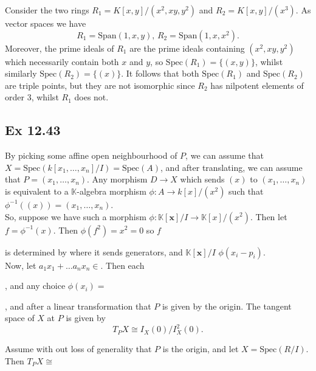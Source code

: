 \documentclass{article}
\theoremstyle{definition}
\newcommand{\K}{\mathbb{K}}
\newcommand{\Kx}{\K[\bm{x}]}
\newcommand{\Spec}{\text{Spec}}
\begin{document}
Consider the two rings $R_1 = K[x, y]/(x^2, xy, y^2)$ and $R_2 = K[x,
y]/(x^3)$. As vector spaces we have 
\[
	R_1 = \text{Span}(1, x, y), \,
	R_2 = \text{Span}(1, x, x^2).
\] 
Moreover, the prime ideals of $R_1$ are the prime ideals containing $(x^2, xy,
y^2)$ which necessarily contain both $x$ and $y$, so $\Spec(R_1) = \{(x, y)\}$,
whilst similarly $\Spec(R_2) = \{(x)\}$. It follows that both $\Spec(R_1)$ and
$\Spec(R_2)$ are triple points, but they are not isomorphic since $R_2$ has
nilpotent elements of order $3$, whilst $R_1$ does not. 

\subsection*{Ex 12.43}

By picking some affine open neighbourhood of $P$, we can assume that $X =
\Spec(k[x_1, \ldots, x_n]/I) = \Spec(A)$, and after translating, we can assume
that $P = (x_1, \ldots, x_n)$. Any morphism $D \to X$ which sends $(x)$ to
$(x_1, \ldots, x_n)$ is equivalent to a $\K$-algebra morphism $\phi : A \to
k[x]/(x^2)$ such that $\phi^{-1}((x)) = (x_1, \ldots, x_n)$. \\

So, suppose we have such a morphism $\phi : \Kx/I \to \K[x]/(x^2)$. Then 
let $f = \phi^{-1}(x)$. Then $\phi(f^2) = x^2 = 0$ so $f$

is determined by where it sends generators, and $\Kx/I$ $\phi(x_i - p_i)$. \\

Now, let $a_1x_1 + \ldots a_n x_n \in $. Then each 

, and any choice 
$\phi(x_i) = $

, and after a linear transformation that $P$ is
given by the origin. The tangent space of $X$ at $P$ is given by 
\[
	T_{P}X \cong I_{X}(0)/I_X^{2}(0).
\] 


Assume with out loss of generality that $P$ is the origin, and let 
$X = \Spec(R/I)$. Then $T_{P}X \cong $






\end{document}
